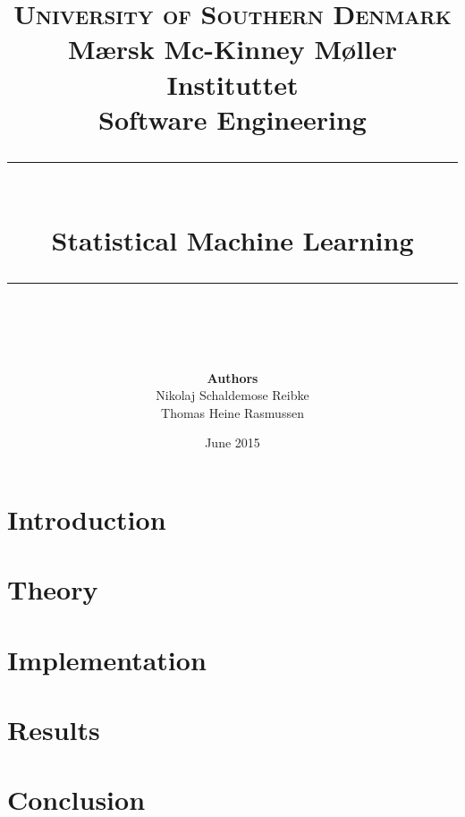 \documentclass[11pt]{article}
\newcommand{\romanTitle}[1]{\MakeUppercase{\thepage}\hspace{0.2cm}#1}
\begin{document}
\title {
	\textsc{\LARGE University of Southern Denmark}\\
	\large Mærsk Mc-Kinney Møller Instituttet\\[1cm]
	\Large Software Engineering\\
	\rule{\linewidth}{0.4pt}\\[0.4cm]Statistical Machine Learning\\\rule{\linewidth}{0.4pt}\\[0.5cm] }

\author{ 
	\textbf{Authors}\\Nikolaj Schaldemose Reibke\\Thomas Heine Rasmussen
}
\date{\vfill June 2015}
\maketitle
\thispagestyle{empty}
\clearpage
\setcounter{page}{1}

\pagestyle{fancy}
\setlength{\headheight}{25.2pt} 


\rfoot{}
\cfoot{}
\lfoot{}

\renewcommand\contentsname{\romanTitle{Table of contents}}
\tableofcontents
\newpage

\setcounter{page}{1}
\rfoot{}
\lfoot{}

\section{Introduction}


\section{Theory}


\section{Implementation}


\section{Results}


\section{Conclusion}

\end{document}
